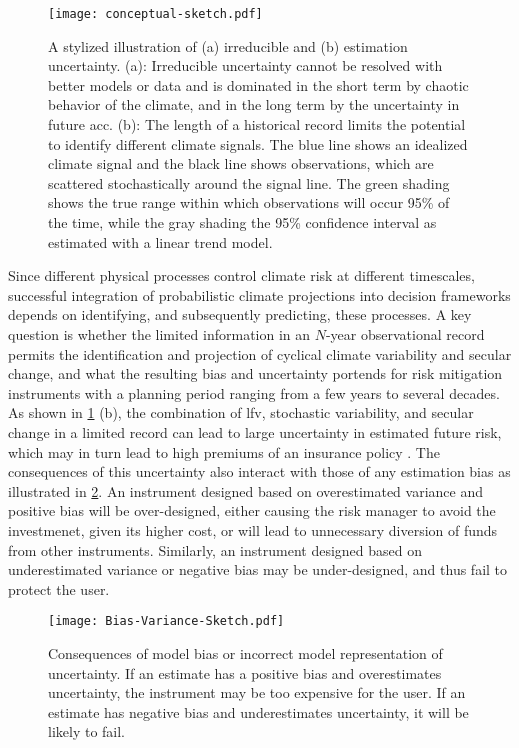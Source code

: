 \documentclass[
  draft,
  linenumbers
]{agujournal2018}
\begin{document}
\begin{figure}
  \centering
  \texttt{[image: conceptual-sketch.pdf]}
  \caption{
    A stylized illustration of (a) irreducible and (b) estimation uncertainty.
    (a): Irreducible uncertainty cannot be resolved with better models or data and is dominated in the short term by chaotic behavior of the climate, and in the long term by the uncertainty in future \acrlong{acc}.
    (b): The length of a historical record limits the potential to identify different climate signals.
    The blue line shows an idealized climate signal and the black line shows observations, which are scattered stochastically around the signal line.
    The green shading shows the true range within which observations will occur 95\% of the time, while the gray shading the 95\% confidence interval as estimated with a linear trend model.
    }\label{fig:conceptual-sketch}
\end{figure}

Since different physical processes control climate risk at different timescales, successful integration of probabilistic climate projections into decision frameworks depends on identifying, and subsequently predicting, these processes.
A key question is whether the limited information in an $N$-year observational record permits the identification and projection of cyclical climate variability and secular change, and what the resulting bias and uncertainty portends for risk mitigation instruments with a planning period ranging from a few years to several decades.
As shown in \cref{fig:conceptual-sketch} (b), the combination of \gls{lfv}, stochastic variability, and secular change in a limited record can lead to large uncertainty in estimated future risk, which may in turn lead to high premiums of an insurance policy \citep{Kunreuther:1996kp}.
The consequences of this uncertainty also interact with those of any estimation bias as illustrated in \cref{fig:conceptual-bias-variance}.
An instrument designed based on overestimated variance and positive bias will be over-designed, either causing the risk manager to avoid the investmenet, given its higher cost, or will lead to unnecessary diversion of funds from other instruments.
Similarly, an instrument designed based on underestimated variance or negative bias may be under-designed, and thus fail to protect the user.
\begin{figure}
  \centering
  \texttt{[image: Bias-Variance-Sketch.pdf]}
  \caption{
    Consequences of model bias or incorrect model representation of uncertainty.
    If an estimate has a positive bias and overestimates uncertainty, the instrument may be too expensive for the user.
    If an estimate has negative bias and underestimates uncertainty, it will be likely to fail.
  }\label{fig:conceptual-bias-variance}
\end{figure}
\end{document}
